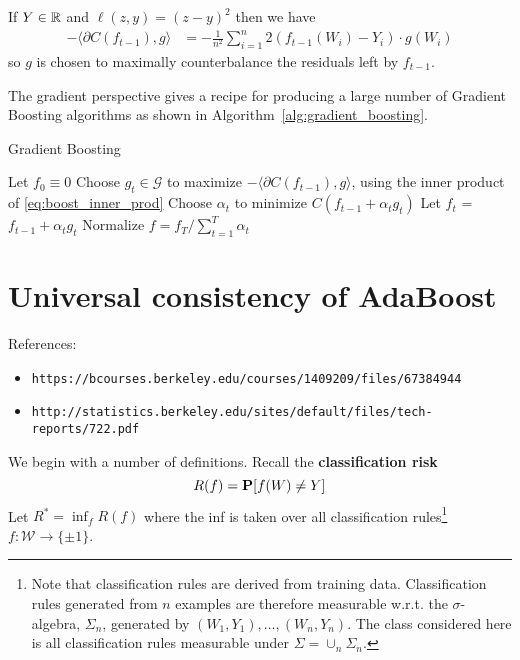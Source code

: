 If $Y \in \mathbb{R}$ and $\ell(z, y) = (z - y)^2$ then we have
\begin{align*}
	-\langle \partial C(f_{t-1}), g \rangle &= -\frac{1}{n^2}\sum_{i=1}^n 2(f_{t-1}(W_i) - Y_i) \cdot g(W_i)
\end{align*}
so $g$ is chosen to maximally counterbalance the residuals left by $f_{t-1}$.

The gradient perspective gives a recipe for producing a large number of Gradient Boosting algorithms as shown in Algorithm~\ref{alg:gradient_boosting}.

\begin{algorithm}
\caption{Gradient Boosting}
   \begin{algorithmic}[1] \label{alg:gradient_boosting}
   \STATE Let $f_0 \equiv 0$
   	\STATE Choose $g_t \in \mathcal{G}$ to maximize $-\langle \partial C(f_{t-1}), g \rangle$, using the inner product of \eqref{eq:boost_inner_prod}
   	\STATE Choose $\alpha_t$ to minimize $C(f_{t-1} + \alpha_t g_t)$
    \STATE Let $f_t$ = $f_{t-1} + \alpha_t g_t$
   \ENDFOR
   \STATE Normalize $f = f_T/\sum_{t=1}^T \alpha_t$
\end{algorithmic}
\end{algorithm}





\section{Universal consistency of AdaBoost}

References:
\begin{itemize}
\item \verb|https://bcourses.berkeley.edu/courses/1409209/files/67384944|
\item \verb|http://statistics.berkeley.edu/sites/default/files/tech-reports/722.pdf|
\end{itemize}

We begin with a number of definitions. Recall the \textbf{classification risk}
\begin{equation*}
	R(f) = \mathbf{P} [f(W) \ne Y]
\end{equation*}
Let $R^* = \inf_f R(f)$ where the inf is taken over all classification rules\footnote{Note that classification rules are derived from training data. Classification rules generated from $n$ examples are therefore measurable w.r.t. the $\sigma$-algebra, $\Sigma_n$, generated by $(W_1, Y_1), \dots, (W_n, Y_n)$. The class considered here is all classification rules measurable under $\Sigma = \cup_n \Sigma_n$.} $f:\mathcal{W} \to \{\pm 1\}$.


